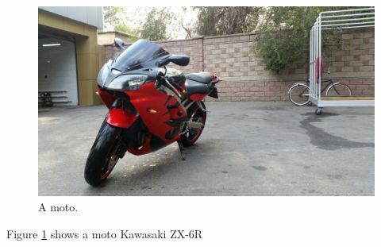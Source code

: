 \documentclass{article}
\begin{document}
\begin{figure}[h!] %
  \includegraphics[width=\linewidth]{moto.jpg}
  \caption{A moto.}
  \label{fig:moto1}
\end{figure}

Figure \ref{fig:moto1} shows a moto Kawasaki ZX-6R
\end{document}
